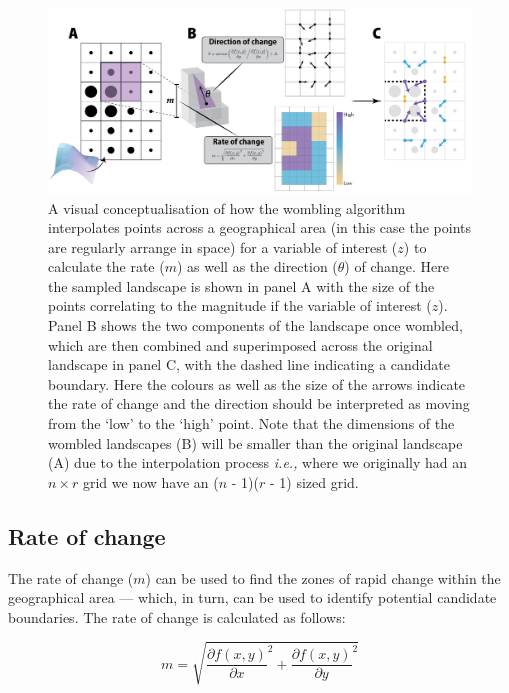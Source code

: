 \begin{refsection}
\begin{figure}[h]
    \centering
    \includegraphics[width=\textwidth]{figures/fig_concept.png}
    \caption{A visual conceptualisation of how the wombling algorithm
interpolates points across a geographical area (in this case the points
are regularly arrange in space) for a variable of interest (\(z\)) to
calculate the rate ($m$) as well as the direction ($\theta$) of
change. Here the sampled landscape is shown in panel A with the size of
the points correlating to the magnitude if the variable of interest
($z$). Panel B shows the two components of the landscape once wombled,
which are then combined and superimposed across the original landscape
in panel C, with the dashed line indicating a candidate boundary. Here
the colours as well as the size of the arrows indicate the rate of
change and the direction should be interpreted as moving from the `low'
to the `high' point. Note that the dimensions of the wombled landscapes
(B) will be smaller than the original landscape (A) due to the
interpolation process \emph{i.e.,} where we originally had an
\(n \times r\) grid we now have an (\(n\) - 1)(\(r\) - 1) sized
grid.}
    \label{fig:concept_womble}
\end{figure}

\subsection{Rate of change}\label{rate-of-change}

The rate of change ($m$) can be used to find the zones of rapid change
within the geographical area --- which, in turn, can be used to identify
potential candidate boundaries. The rate of change is calculated as
follows:

\begin{equation} \label{eq:1}
m = \sqrt{\frac{\partial f(x,y)}{\partial x}^2 + \frac{\partial f(x,y)}{\partial y}^2}
\end{equation}


\end{refsection}
